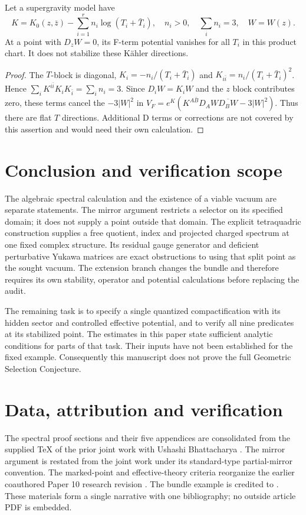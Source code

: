 \begin{proposition}\label{prop:noscale}
Let a supergravity model have
\[
 K=K_0(z,\bar z)-\sum_{i=1}^r n_i\log(T_i+\bar T_i),
 \quad n_i>0,\quad\sum_i n_i=3,\quad W=W(z).
\]
At a point with $D_zW=0$, its F-term potential vanishes for all $T_i$
in this product chart. It does not stabilize these K\"ahler directions.
\end{proposition}
\begin{proof}
The $T$-block is diagonal,
$K_i=-n_i/(T_i+\bar T_i)$ and
$K_{i\bar i}=n_i/(T_i+\bar T_i)^2$. Hence
$\sum_iK^{i\bar i}K_iK_{\bar i}=\sum_i n_i=3$.
Since $D_iW=K_iW$ and the $z$ block contributes zero, these terms cancel
the $-3|W|^2$ in $V_F=e^K(K^{A\bar B}D_AW\overline{D_BW}-3|W|^2)$.
Thus there are flat $T$ directions. Additional D terms or corrections are
not covered by this assertion and would need their own calculation.
\end{proof}




\section{Conclusion and verification scope}\label{sec:conclusion}
The algebraic spectral calculation and the existence of a viable vacuum
are separate statements. The mirror argument restricts a selector on its
specified domain; it does not supply a point outside that domain.
The explicit tetraquadric construction supplies a free quotient, index
and projected charged spectrum at one fixed complex structure.
Its residual gauge generator and deficient perturbative Yukawa matrices
are exact obstructions to using that split point as the sought vacuum.
The extension branch changes the bundle and therefore requires its own
stability, operator and potential calculations before replacing the audit.

The remaining task is to specify a single quantized compactification
with its hidden sector and controlled effective potential, and to verify
all nine predicates at its stabilized point. The estimates in this paper
state sufficient analytic conditions for parts of that task. Their
inputs have not been established for the fixed example. Consequently this
manuscript does not prove the full Geometric Selection Conjecture.

\section*{Data, attribution and verification}
The spectral proof sections and their five appendices are consolidated
from the supplied TeX of the prior joint work with Ushashi Bhattacharya
\cite{Dwork}. The mirror argument is restated from the joint work
\cite{Mirror} under its standard-type partial-mirror convention.
The marked-point and effective-theory criteria reorganize the earlier
coauthored Paper 10 research revision \cite{Paper10}.
The bundle example is credited to \cite{BCL}. These materials form a
single narrative with one bibliography; no outside article PDF is embedded.

